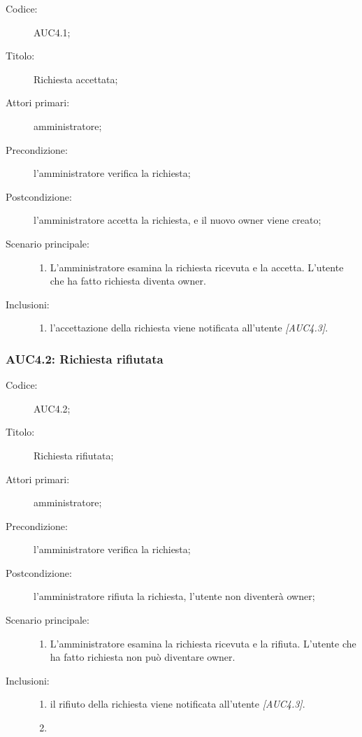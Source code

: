 \documentclass[../../../analisi-dei-requisiti.tex]{subfiles}
\begin{document}
\begin{description}
  \item[Codice:] AUC4.1;
  \item[Titolo:] Richiesta accettata;
  \item[Attori primari:] amministratore;
  \item[Precondizione:] l'amministratore verifica la richiesta;
  \item[Postcondizione:] l'amministratore accetta la richiesta, e il nuovo owner viene creato;
  \item[Scenario principale:]
  \begin{enumerate}
    \item L'amministratore esamina la richiesta ricevuta e la accetta. L'utente che ha fatto richiesta diventa owner.
  \end{enumerate}
  \item[Inclusioni:]
  \begin{enumerate}
    \item l'accettazione della richiesta viene notificata all'utente \emph{[AUC4.3]}.
  \end{enumerate}
\end{description}

\subsubsection{AUC4.2: Richiesta rifiutata}%
\label{subs:AUC4.2}

\begin{description}
  \item[Codice:] AUC4.2;
  \item[Titolo:] Richiesta rifiutata;
  \item[Attori primari:] amministratore;
  \item[Precondizione:] l'amministratore verifica la richiesta;
  \item[Postcondizione:] l'amministratore rifiuta la richiesta, l'utente non diventerà owner;
  \item[Scenario principale:]
  \begin{enumerate}
    \item L'amministratore esamina la richiesta ricevuta e la rifiuta. L'utente che ha fatto richiesta non può diventare owner.
  \end{enumerate}
  \item[Inclusioni:]
  \begin{enumerate}
    \item il rifiuto della richiesta viene notificata all'utente \emph{[AUC4.3]}.
    \item
  \end{enumerate}
\end{description}
\end{document}
